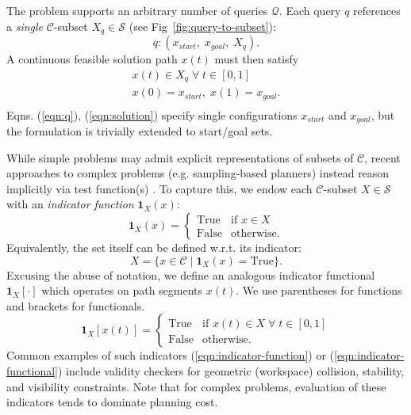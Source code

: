 The problem supports an arbitrary number of queries $\mathcal{Q}$.
Each query $q$ references a \emph{single}
$\mathcal{C}$-subset $X_q \in \mathcal{S}$
(see Fig~\ref{fig:query-to-subset}):
\begin{equation}
  q : ( x_{start},\; x_{goal},\; X_q ) .
  \label{eqn:q}
\end{equation}
A continuous feasible solution path $x(t)$ must then satisfy
\begin{equation}
  \begin{array}{c}
  x(t) \in X_q \;\forall\; t \in [0,1] \\
  x(0) = x_{start},\; x(1) = x_{goal} . \\
  \end{array}
  \label{eqn:solution}
\end{equation}
Eqns. (\ref{eqn:q}), (\ref{eqn:solution})
specify single configurations
$x_{start}$ and $x_{goal}$,
but the formulation is trivially extended to start/goal sets.

While simple problems may admit explicit representations of
subsets of $\mathcal{C}$,
recent approaches to complex problems
(e.g. sampling-based planners)
instead reason implicitly via test function(s)
\cite{lavalle2006planningbook}.
To capture this,
we endow each $\mathcal{C}$-subset $X \in \mathcal{S}$ with an
\emph{indicator function} $\mathbf{1}_X(x)$:
\begin{equation}
  \mathbf{1}_X(x) =
    \left\{ \begin{array}{ll}
      \mbox{True} & \mbox{if } x \in X \\
      \mbox{False} & \mbox{otherwise}.
    \end{array} \right.
  \label{eqn:indicator-function}
\end{equation}
Equivalently, the set itself can be defined w.r.t. its indicator:
\begin{equation}
  X = \{ x \in \mathcal{C} \;|\; \mathbf{1}_X(x) = \mbox{True} \} .
\end{equation}
Excusing the abuse of notation,
we define an analogous indicator functional $\mathbf{1}_X[\cdot]$
which operates on path segments $x(t)$.
We use parentheses for functions and brackets for functionals.
\begin{equation}
  \mathbf{1}_X[x(t)] =
    \left\{ \begin{array}{ll}
      \mbox{True} & \mbox{if } x(t) \in X \;\forall\; t \in [0,1] \\
      \mbox{False} & \mbox{otherwise}.
    \end{array} \right.
  \label{eqn:indicator-functional}
\end{equation}
Common examples of such indicators
(\ref{eqn:indicator-function}) or (\ref{eqn:indicator-functional})
include validity checkers for
geometric (workspace) collision,
stability, and visibility constraints.
Note that for complex problems,
evaluation of these indicators 
tends to dominate planning cost.

